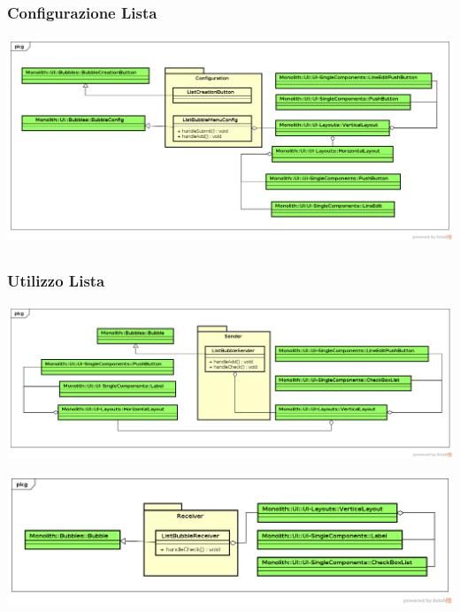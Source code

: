 \subsection{}
\begin{frame}
	\frametitle{Configurazione Lista}
	\begin{center}
		\includegraphics[scale=0.25]{img/listchecklistConfiguration.png}
	\end{center}
\end{frame}

\subsection{}
\begin{frame}
	\frametitle{Utilizzo Lista}
	\begin{center}
		\includegraphics[scale=0.25]{img/listchecklistSender.png}
	\end{center}
	\begin{center}
		\includegraphics[scale=0.30]{img/listchecklistReceiver.png}
	\end{center}
\end{frame}

